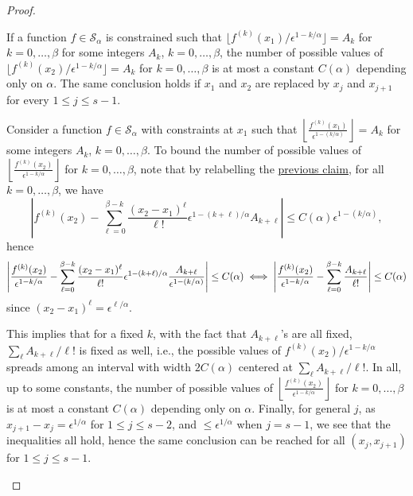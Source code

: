 \begin{proof}
	\begin{claim}\label{clm:metric-entropy-d}
		If a function \(f\in \mathcal{S} _\alpha \) is constrained such that \(\lfloor f^{(k)} (x_1) / \epsilon ^{1 - k / \alpha }\rfloor = A_k\) for \(k = 0, \dots , \beta \) for some integers \(A_k\), \(k = 0, \dots , \beta \), the number of possible values of \(\lfloor f^{(k)} (x_2) / \epsilon ^{1 - k / \alpha }\rfloor = A_k\) for \(k = 0, \dots , \beta \) is at most a constant \(C(\alpha )\) depending only on \(\alpha \). The same conclusion holds if \(x_1\) and \(x_2\) are replaced by \(x_j\) and \(x_{j+1}\) for every \(1 \leq j \leq s-1\).
	\end{claim}
	\begin{explanation}
		Consider a function \(f\in \mathcal{S} _\alpha \) with constraints at \(x_1\) such that \(\left\lfloor \frac{f^{(k)}(x_1)}{\epsilon ^{1 - (k / \alpha )}} \right\rfloor = A_k\) for some integers \(A_k\), \(k = 0, \dots , \beta \). To bound the number of possible values of \(\left\lfloor \frac{f^{(k)}(x_2)}{\epsilon ^{1 - k / \alpha }} \right\rfloor\) for \(k = 0, \dots , \beta \), note that by relabelling the \hyperref[clm:metric-entropy-c]{previous claim}, for all \(k = 0, \dots , \beta \), we have
		\[
			\left\vert f^{(k)}(x_2) - \sum_{\ell =0}^{\beta - k} \frac{(x_2 - x_1)^{\ell } }{\ell !} \epsilon ^{1 - (k + \ell ) / \alpha } A_{k + \ell } \right\vert
			\leq C(\alpha ) \epsilon ^{1 - (k / \alpha )},
		\]
		hence
		\[
			\left\vert \frac{f^{(k)}(x_2)}{\epsilon ^{1 - k / \alpha }} - \sum_{\ell = 0}^{\beta - k} \frac{(x_2 - x_1)^{\ell } }{\ell !} \epsilon ^{1 - (k + \ell ) / \alpha } \frac{A_{k + \ell }}{\epsilon ^{1 - (k / \alpha )}} \right\vert
			\leq C(\alpha )\\
			\iff \left\vert \frac{f^{(k)}(x_2)}{\epsilon ^{1 - k / \alpha }} - \sum_{\ell = 0}^{\beta - k} \frac{A_{k + \ell }}{\ell !} \right\vert
			\leq C(\alpha )
		\]
		since \((x_2 - x_1)^{\ell } = \epsilon ^{\ell / \alpha }\).

		This implies that for a fixed \(k\), with the fact that \(A_{k+\ell }\)'s are all fixed, \(\sum_{\ell } A_{k + \ell } / \ell !\) is fixed as well, i.e., the possible values of \(f^{(k)}(x_2) / \epsilon ^{1 - k / \alpha }\) spreads among an interval with width \(2C(\alpha )\) centered at \(\sum_{\ell } A_{k + \ell } / \ell !\). In all, up to some constants, the number of possible values of \(\left\lfloor \frac{f^{(k)}(x_2)}{\epsilon ^{1 - k / \alpha }} \right\rfloor\) for \(k = 0, \dots , \beta \) is at most a constant \(C(\alpha )\) depending only on \(\alpha \). Finally, for general \(j\), as \(x_{j+1} - x_j = \epsilon ^{1 / \alpha }\) for \(1 \leq j \leq s-2\), and \(\leq \epsilon ^{1 / \alpha }\) when \(j = s-1\), we see that the inequalities all hold, hence the same conclusion can be reached for all \((x_j, x_{j+1})\) for \(1 \leq j \leq s-1\).
	\end{explanation}


\end{proof}
